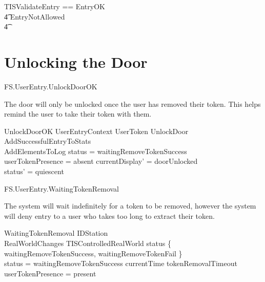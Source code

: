 \begin{zed}
        TISValidateEntry == EntryOK
\\ \t4          \lor EntryNotAllowed
\\ \t4          \lor [~ UserTokenTorn | status = waitingEntry ~] 
\end{zed}


\section{Unlocking the Door}

\begin{traceunit}{FS.UserEntry.UnlockDoorOK}
\end{traceunit}


The door will only be unlocked once the user has removed their token.
This helps remind the user to take their token with them.

\begin{schema}{UnlockDoorOK}
        UserEntryContext
\also
      \Xi UserToken
\also
        UnlockDoor
\\      AddSuccessfulEntryToStats
\\      AddElementsToLog
\where
        status = waitingRemoveTokenSuccess
\\      userTokenPresence = absent
\also
        currentDisplay' = doorUnlocked
\\      status' = quiescent
\end{schema}

\begin{traceunit}{FS.UserEntry.WaitingTokenRemoval}
\end{traceunit}

The system will wait indefinitely for a token to be removed, however
the system will deny entry to a user who takes too long to extract
their token.

\begin{schema}{WaitingTokenRemoval}
        \Xi IDStation
\\      RealWorldChanges
\also
        \Xi TISControlledRealWorld
\where
        status \in \{ waitingRemoveTokenSuccess, 
waitingRemoveTokenFail \}
\\      status = waitingRemoveTokenSuccess \implies currentTime \leq tokenRemovalTimeout 
\\      userTokenPresence = present
\end{schema}

